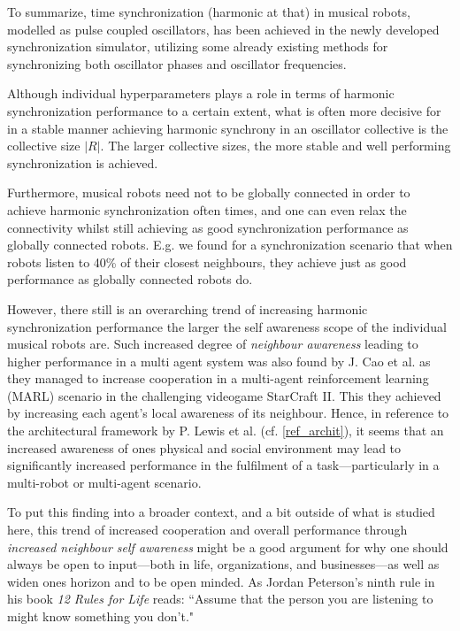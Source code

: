 	To summarize, time synchronization (harmonic at that) in musical robots, modelled as pulse coupled oscillators, has been achieved in the newly developed synchronization simulator, utilizing some already existing methods for synchronizing both oscillator phases and oscillator frequencies.
	
	Although individual hyperparameters plays a role in terms of harmonic synchronization performance to a certain extent, what is often more decisive for in a stable manner achieving harmonic synchrony in an oscillator collective is the collective size $|R|$. The larger collective sizes, the more stable and well performing synchronization is achieved.
	
	Furthermore, musical robots need not to be globally connected in order to achieve harmonic synchronization often times, and one can even relax the connectivity whilst still achieving as good synchronization performance as globally connected robots. E.g. we found for a synchronization scenario that when robots listen to 40\% of their closest neighbours, they achieve just as good performance as globally connected robots do.
	
	However, there still is an overarching trend of increasing harmonic synchronization performance the larger the self awareness scope of the individual musical robots are. Such increased degree of \textit{neighbour awareness} leading to higher performance in a multi agent system was also found by J. Cao et al. \cite{LINDA} as they managed to increase cooperation in a multi-agent reinforcement learning (MARL) scenario in the challenging videogame StarCraft II. This they achieved by increasing each agent's local awareness of its neighbour. Hence, in reference to the architectural framework by P. Lewis et al. \cite{sacs16_ch4} (cf. \ref{ref_archit}), it seems that an increased awareness of ones physical and social environment may lead to significantly increased performance in the fulfilment of a task—particularly in a multi-robot or multi-agent scenario.
	
	
	To put this finding into a broader context, and a bit outside of what is studied here, this trend of increased cooperation and overall performance through \textit{increased neighbour self awareness} might be a good argument for why one should always be open to input—both in life, organizations, and businesses—as well as widen ones horizon and to be open minded. As Jordan Peterson's ninth rule in his book \textit{12 Rules for Life} reads: ``Assume that the person you are listening to might know something you don't."


